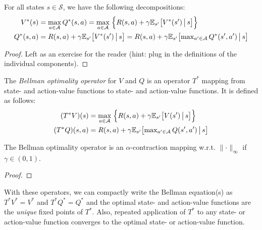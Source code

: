 				\begin{theorem}
					For all states \(s \in \mathcal{S}\), we have the following decompositions:
					\begin{align}
						V^\ast(s)    & = \max_{a \in \mathcal{A}} Q^\ast(s, a)
						= \max_{a \in \mathcal{A}} \;\Bigl\{ R(s, a) + \gamma \mathbb{E}_{s'}\bigl[ V^\ast(s') \,\big\vert\, s \bigr] \Bigr\} \\
						Q^\ast(s, a) & = R(s, a) + \gamma \mathbb{E}_{s'}\bigl[ V^\ast(s') \,\big\vert\, s \bigr]
						= R(s, a) + \gamma \mathbb{E}_{s'}\bigl[ \textstyle\max_{a' \in \mathcal{A}}\displaystyle Q^\ast(s', a') \,\big\vert\, s \bigr]  \label{eq:bellmanOptEqQ}
					\end{align}
				\end{theorem}
				\begin{proof}
					Left as an exercise for the reader (hint: plug in the definitions of the individual components).
				\end{proof}

				\begin{definition}  \label{def:bellmanOptimalityOperator}
					The \emph{Bellman optimality operator} for \(V\) and \(Q\) is an operator \(T^\ast\) mapping from state- and action-value functions to state- and action-value functions. It is defined as follows:
					\begin{align}
						(T^\ast V)(s)    & = \max_{a \in \mathcal{A}} \;\Bigl\{ R(s, a) + \gamma \mathbb{E}_{s'}\bigl[ V(s') \,\big\vert\, s \bigr] \Bigr\}           \\
						(T^\ast Q)(s, a) & = R(s, a) + \gamma \mathbb{E}_{s'}\bigl[ \textstyle\max_{a' \in \mathcal{A}}\displaystyle Q(s', a') \,\big\vert\, s \bigr]
					\end{align}
				\end{definition}
				\begin{theorem}  \label{th:bellmanOptimalityOperatorContract}
					The Bellman optimality operator is an \(\alpha\)-contraction mapping w.r.t. \( \lVert \cdot \rVert_\infty \) if \( \gamma \in (0, 1) \).
				\end{theorem}
				\begin{proof}
				\end{proof}
				\begin{remark}
					With these operators, we can compactly write the Bellman equation(s) as \( T^\ast V^\ast = V^\ast \) and \( T^\ast Q^\ast = Q^\ast \) and the optimal state- and action-value functions are the \emph{unique} fixed points of \(T^\ast\). Also, repeated application of \(T^\ast\) to any state- or action-value function converges to the optimal state- or action-value function.
				\end{remark}

